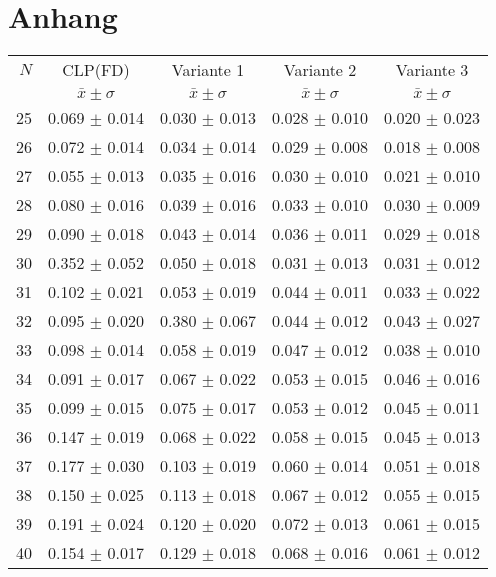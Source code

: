 \documentclass[12pt,a4paper]{article}
\begin{document}
\section{Anhang}
\begin{table}[H]
\centering
\small
\setlength{\tabcolsep}{6pt}
\begin{tabular}{rcccc}
\toprule
$N$ & CLP(FD) & Variante 1 & Variante 2 & Variante 3 \\
 & $\bar{x} \pm \sigma$ & $\bar{x} \pm \sigma$ & $\bar{x} \pm \sigma$ & $\bar{x} \pm \sigma$ \\
\midrule
25 & 0.069 $\pm$ 0.014 & 0.030 $\pm$ 0.013 & 0.028 $\pm$ 0.010 & 0.020 $\pm$ 0.023 \\
26 & 0.072 $\pm$ 0.014 & 0.034 $\pm$ 0.014 & 0.029 $\pm$ 0.008 & 0.018 $\pm$ 0.008 \\
27 & 0.055 $\pm$ 0.013 & 0.035 $\pm$ 0.016 & 0.030 $\pm$ 0.010 & 0.021 $\pm$ 0.010 \\
28 & 0.080 $\pm$ 0.016 & 0.039 $\pm$ 0.016 & 0.033 $\pm$ 0.010 & 0.030 $\pm$ 0.009 \\
29 & 0.090 $\pm$ 0.018 & 0.043 $\pm$ 0.014 & 0.036 $\pm$ 0.011 & 0.029 $\pm$ 0.018 \\
30 & 0.352 $\pm$ 0.052 & 0.050 $\pm$ 0.018 & 0.031 $\pm$ 0.013 & 0.031 $\pm$ 0.012 \\
31 & 0.102 $\pm$ 0.021 & 0.053 $\pm$ 0.019 & 0.044 $\pm$ 0.011 & 0.033 $\pm$ 0.022 \\
32 & 0.095 $\pm$ 0.020 & 0.380 $\pm$ 0.067 & 0.044 $\pm$ 0.012 & 0.043 $\pm$ 0.027 \\
33 & 0.098 $\pm$ 0.014 & 0.058 $\pm$ 0.019 & 0.047 $\pm$ 0.012 & 0.038 $\pm$ 0.010 \\
34 & 0.091 $\pm$ 0.017 & 0.067 $\pm$ 0.022 & 0.053 $\pm$ 0.015 & 0.046 $\pm$ 0.016 \\
35 & 0.099 $\pm$ 0.015 & 0.075 $\pm$ 0.017 & 0.053 $\pm$ 0.012 & 0.045 $\pm$ 0.011 \\
36 & 0.147 $\pm$ 0.019 & 0.068 $\pm$ 0.022 & 0.058 $\pm$ 0.015 & 0.045 $\pm$ 0.013 \\
37 & 0.177 $\pm$ 0.030 & 0.103 $\pm$ 0.019 & 0.060 $\pm$ 0.014 & 0.051 $\pm$ 0.018 \\
38 & 0.150 $\pm$ 0.025 & 0.113 $\pm$ 0.018 & 0.067 $\pm$ 0.012 & 0.055 $\pm$ 0.015 \\
39 & 0.191 $\pm$ 0.024 & 0.120 $\pm$ 0.020 & 0.072 $\pm$ 0.013 & 0.061 $\pm$ 0.015 \\
40 & 0.154 $\pm$ 0.017 & 0.129 $\pm$ 0.018 & 0.068 $\pm$ 0.016 & 0.061 $\pm$ 0.012 \\

\end{tabular}
\end{table}
\end{document}
